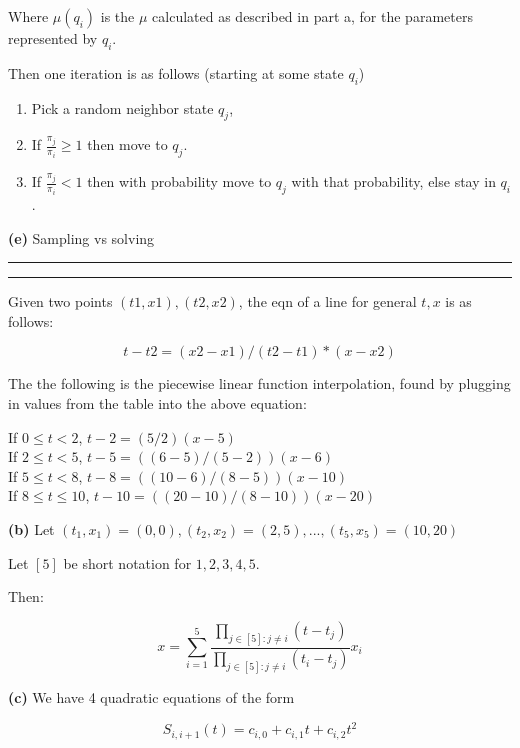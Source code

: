 \documentclass[11pt,letterpaper]{article}
\newcommand{\question}[1] {\vspace{.25in} \hrule\vspace{0.5em}
\noindent{\bf #1} \vspace{0.5em}
\hrule \vspace{.10in}}
\renewcommand{\part}[1] {\vspace{.10in} {\bf (#1)}}
\begin{document}
Where $\mu(q_i)$ is the $\mu$ calculated as described in part a, for the parameters represented by $q_i$.

Then one iteration is as follows (starting at some state $q_i$)

\begin{enumerate}
\item Pick a random neighbor state $q_j$,
\item If $\frac{\pi_j}{\pi_i} \geq 1$ then move to $q_j$.
\item If $\frac{\pi_j}{\pi_i} < 1$ then with probability move to $q_j$ with that probability, else stay in $q_i$.
\end{enumerate}


\part{e}
Sampling vs solving

\question{3}
Given two points $(t1,x1),(t2,x2)$, the eqn of a line for general $t,x$ is as follows:

$$t - t2 = (x2 - x1)/(t2 - t1) * (x - x2)$$

The the following is the piecewise linear function interpolation, found by plugging in values from the table into the above equation:

If $0 \leq t < 2$, $t - 2 = (5/2)(x - 5)$\\
If $2 \leq t < 5$, $t - 5 = ((6-5)/(5-2))(x-6)$\\
If $5 \leq t < 8$, $t - 8 = ((10-6)/(8-5))(x-10)$\\
If $8 \leq t \leq 10$, $t - 10 = ((20-10)/(8-10))(x-20)$

\part{b}
Let $(t_1, x_1) = (0,0), (t_2, x_2) = (2,5), ... , (t_5,x_5) = (10,20) $

Let $[5]$ be short notation for ${1,2,3,4,5}$.

Then:

$$x = \sum_{i=1}^{5} \frac{\prod_{j \in [5] : j \neq i} (t - t_j)}{\prod_{j \in [5] : j \neq i} (t_i - t_j)} x_i$$

\part{c}
We have 4 quadratic equations of the form

$$S_{i,i+1}(t) = c_{i,0} + c_{i,1} t + c_{i,2} t^2$$
\end{document}
